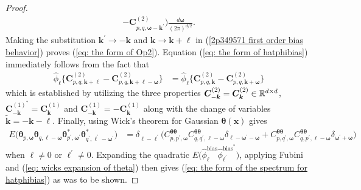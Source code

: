 \documentclass[10pt,noinfoline]{imsart}
\newcommand{\bs}{\boldsymbol}
\begin{document}
\begin{proof}
\begin{align}
        - {\bs C^{(2)}_{p,q,\bs\omega-\bs k^\prime}}
        \Bigr)\frac{d\bs\omega}{(2\pi)^{d/2}}.
        \label{2p349571 first order bias behavior}
    \end{align}
    Making the substitution $\bs k^\prime \rightarrow -\bs k$ and $\bs k\rightarrow \bs k+\bs \ell$ in (\ref{2p349571 first order bias behavior}) proves (\ref{eq: the form of Op2}). Equation (\ref{eq: the form of hatphibias}) immediately follows from the fact that
    \begin{align*}
	\hat\phi_{\bs \ell}\Big\{{\bs C^{(2)}_{p,q,\bs k+\bs \ell}}- {\bs C^{(2)}_{p,q,\bs k+\bs \ell - \bs\omega}}\Big\}
    &=\hat\phi_{\bs \ell}\Big\{{\bs C^{(2)}_{p,q,\bs k}}- {\bs C^{(2)}_{p,q,\bs k + \bs\omega}}\Big\}
    \end{align*}
    which is established by utilizing the three properties $\bs C^{(2)}_{-\bs k} = \bs C^{(2)}_{\bs k}\in\Bbb R^{d\times d}$, $\bs C^{(1)^*}_{-\bs k} = \bs C^{(1)}_{\bs k}$ and $\bs C^{(1)}_{-\bs k} = -\bs C^{(1)}_{\bs k}$ along with the change of variables $\tilde {\bs k} = - \bs k - \bs \ell $. Finally, using Wick's theorem for Gaussian $\bs \theta(\bs x)$ gives
    \begin{align}
    \label{eq: wicks expansion of theta}
    E\big(\bs \theta_{p,\bs\omega}\bs \theta_{q,\bs \ell - \bs\omega}\bs \theta_{p^\prime,\bs\omega^\prime}^* \bs \theta_{q^\prime,\bs\ell^\prime - \bs\omega^\prime}^*\big)
    &= \delta_{\bs \ell - \bs \ell^\prime}\big(C^{\bs \theta\bs \theta}_{p,p^\prime,\bs \omega}C^{\bs \theta\bs \theta}_{q,q^\prime,\bs \ell - \bs \omega}\delta_{\bs \ell - \bs\omega^\prime - \bs \omega}
        + C^{\bs \theta\bs \theta}_{p,q^\prime,\bs \omega}C^{\bs \theta\bs \theta}_{q,p^\prime,\bs \ell - \bs \omega}\delta_{ \bs\omega^\prime + \bs \omega}  \big)
    \end{align}
    when $\bs \ell \neq 0$ or $\bs \ell^\prime \neq 0$. Expanding the quadratic $E\big(\hat\phi_{\bs \ell}^{\text{bias}} \hat\phi_{\bs \ell^\prime}^{\text{bias}^*}\big)$, applying Fubini and (\ref{eq: wicks expansion of theta}) then gives (\ref{eq: the form of the spectrum for hatphibias}) as was to be shown.
\end{proof}
\end{document}
